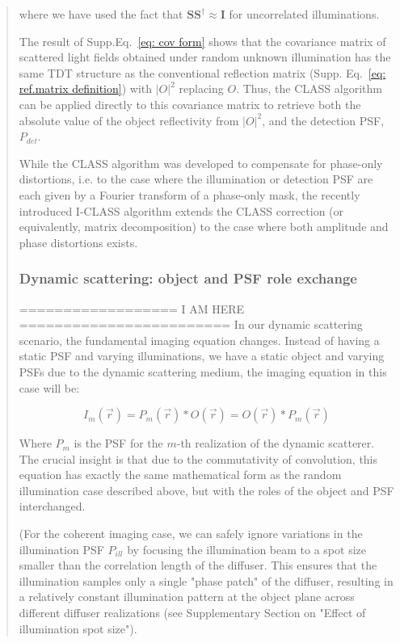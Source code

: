 \documentclass[12pt]{article}
\newenvironment{ourresponse}
    {\begin{tcolorbox}[width=\linewidth,breakable,enhanced,colback=gray!5,colframe=responsecolor!50,title=Response,left=5pt,right=5pt]}
    {\end{tcolorbox}}
\begin{document}
\begin{ourresponse}
\begin{quote}
where we have used the fact that  $\mathbf{S} \mathbf{S}^{\dagger} \approx \mathbf{I}$ for uncorrelated illuminations. 

The result of Supp.Eq.~\ref{eq: cov form} shows that the covariance matrix of scattered light fields obtained under random unknown illumination has the same TDT structure as the conventional reflection matrix (Supp. Eq.~\ref{eq: ref.matrix definition}) with $|O|^2$ replacing $O$. Thus, the CLASS algorithm can be applied directly to this covariance matrix to retrieve both the absolute value of the object reflectivity from $|O|^2$, and the detection PSF, $P_{det}$.

While the CLASS algorithm was developed to compensate for phase-only distortions, i.e. to the case where the illumination or detection PSF are each given by a Fourier transform of a phase-only mask, the recently introduced I-CLASS algorithm \cite{weinberg2024noninvasive} extends the CLASS correction (or equivalently, matrix decomposition) to the case where both amplitude and phase distortions exists. 

\subsubsection*{Dynamic scattering: object and PSF role exchange}
==================  I AM HERE  ========================
In our dynamic scattering scenario, the fundamental imaging equation changes. Instead of having a static PSF and varying illuminations, we have a static object and varying PSFs due to the dynamic scattering medium, the imaging equation in this case will be:

\begin{equation}
I_m(\vec{r}) = P_m(\vec{r}) * O(\vec{r}) = O(\vec{r}) * P_m(\vec{r})
\end{equation}

Where $P_m$ is the PSF for the $m$-th realization of the dynamic scatterer. The crucial insight is that due to the commutativity of convolution, this equation has exactly the same mathematical form as the random illumination case described above, but with the roles of the object and PSF interchanged.

(For the coherent imaging case, we can safely ignore variations in the illumination PSF $P_{ill}$ by focusing the illumination beam to a spot size smaller than the correlation length of the diffuser. This ensures that the illumination samples only a single "phase patch" of the diffuser, resulting in a relatively constant illumination pattern at the object plane across different diffuser realizations (see Supplementary Section on "Effect of illumination spot size").


\end{quote}
\end{ourresponse}
\end{document}
